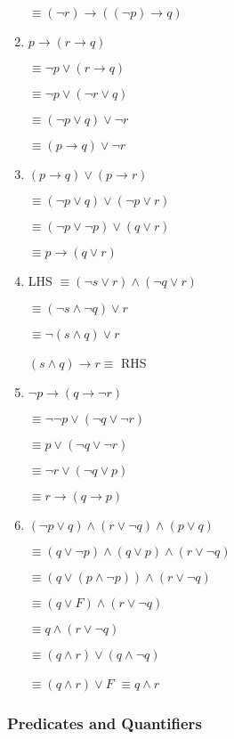 \documentclass{sig-alternate-05-2015}
\begin{document}
\begin{enumerate}
$\equiv  (\neg r)\rightarrow ((\neg p)\rightarrow q)$

\item $p \rightarrow (r \rightarrow q)$

$\equiv \neg p \vee  (r \rightarrow q)$

$\equiv \neg p \vee  (\neg r \vee q)$

$\equiv (\neg p \vee   q) \vee \neg r$

$\equiv ( p \rightarrow q) \vee \neg r$

\item  $(p \rightarrow q) \vee (p \rightarrow r)$

$\equiv (\neg p \vee q) \vee (\neg p \vee r)$

$\equiv (\neg p \vee \neg p) \vee ( q \vee r)$

$\equiv  p \rightarrow ( q \vee r)$

\item LHS $\equiv (\neg s \vee r) \wedge (\neg q \vee r)$

$\equiv(\neg s \wedge \neg q) \vee r $

$\equiv\neg ( s \wedge q) \vee r $

$(s \wedge q)\rightarrow r \equiv$ RHS 

\item  $\neg p \rightarrow (q \rightarrow \neg r)$

$\equiv \neg \neg p \vee (\neg q \vee \neg r)$

$\equiv  p \vee (\neg q \vee \neg r)$

$\equiv  \neg r \vee (\neg q \vee p)$

$\equiv r \rightarrow (q \rightarrow p)$

\item $(\neg p \vee q) \wedge (r \vee \neg q) \wedge (p \vee q)$

$ \equiv (q \vee \neg p)\wedge (q \vee p) \wedge (r \vee \neg q) $

$\equiv(q\vee (p \wedge \neg p)) \wedge (r \vee \neg q)$

$\equiv(q\vee F)\wedge (r \vee \neg q)$

$\equiv q \wedge (r \vee \neg q)$

$\equiv (q \wedge r )\vee( q \wedge \neg q)$

$\equiv (q\wedge r)\vee F$
$\equiv q\wedge r$
\end{enumerate}

\subsubsection{Predicates and Quantifiers}
\end{document}
